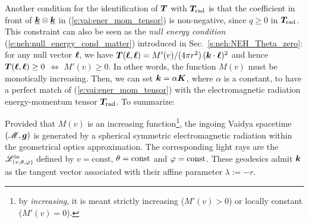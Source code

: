 Another condition for the identification of $\bm{T}$ with $\bm{T}_{\rm rad}$ is that the coefficient
in front of $\underline{\bm{k}} \otimes \underline{\bm{k}}$ in (\ref{e:vai:ener_mom_tensor})
is non-negative, since $q\geq 0$ in $\bm{T}_{\rm rad}$. This constraint can also be seen as the \emph{null energy condition} (\ref{e:neh:null_energy_cond_matter}) introduced in
Sec.~\ref{s:neh:NEH_Theta_zero}: for any null vector $\bm{\ell}$, we have
$\bm{T}(\bm{\ell},\bm{\ell}) = M'(v)/(4\pi r^2)\, (\bm{k}\cdot\bm{\ell})^2$ and hence $\bm{T}(\bm{\ell},\bm{\ell}) \geq 0$ $\iff$
$M'(v) \geq 0$. In other words, the function $M(v)$ must be monotically increasing. Then, we can set
$\bm{k} = \alpha \bm{K}$, where $\alpha$ is a constant, to have a perfect match of (\ref{e:vai:ener_mom_tensor}) with the electromagnetic radiation energy-momentum
tensor $\bm{T}_{\rm rad}$.
To summarize:
\begin{prop}
Provided that $M(v)$ is an increasing function\footnote{by \emph{increasing}, it is meant
strictly increasing ($M'(v)>0$) or locally constant ($M'(v) = 0$).},
the ingoing Vaidya spacetime $(\mathscr{M},\bm{g})$ is generated by a spherical symmetric electromagnetic radiation
within the geometrical optics approximation. The corresponding light rays are the
$\mathscr{L}^{\rm in}_{(v,\theta,\varphi)}$
defined by $v=\mathrm{const}$, $\theta=\mathrm{const}$ and $\varphi=\mathrm{const}$.
These geodesics admit $\bm{k}$ as the tangent vector associated with their affine parameter
$\lambda := -r$.
\end{prop}


